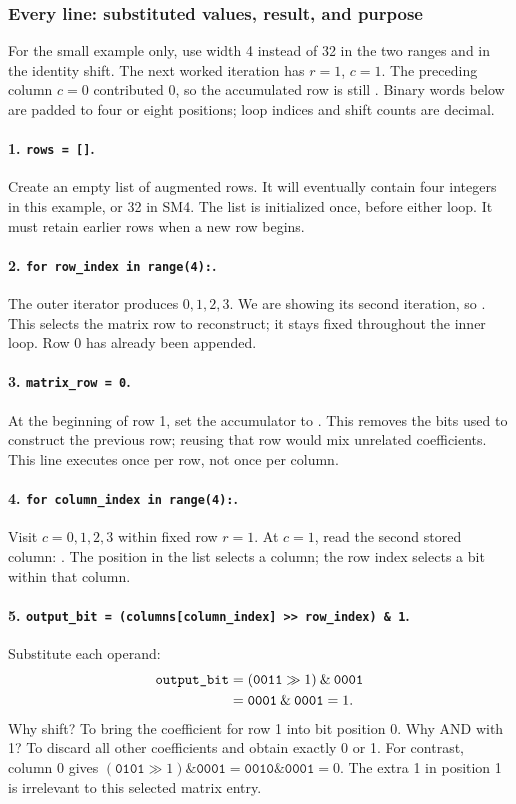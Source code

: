 \subsubsection*{Every line: substituted values, result, and purpose}
For the small example only, use width 4 instead of 32 in the two ranges and in
the identity shift. The next worked iteration has $r=1$, $c=1$.
The preceding column $c=0$ contributed 0, so the accumulated row is still
. Binary words below are padded to four or eight positions; loop
indices and shift counts are decimal.

\paragraph{1. \texttt{rows = []}.}
Create an empty list of augmented rows. It will eventually contain four
integers in this example, or 32 in SM4. The list is initialized once, before
either loop. It must retain earlier rows when a new row begins.

\paragraph{2. \texttt{for row\_index in range(4):}.}
The outer iterator produces $0,1,2,3$. We are showing its second iteration,
so . This selects the matrix row to reconstruct; it stays
fixed throughout the inner loop. Row 0 has already been appended.

\paragraph{3. \texttt{matrix\_row = 0}.}
At the beginning of row 1, set the accumulator to . This removes the
bits used to construct the previous row; reusing that row would mix unrelated
coefficients. This line executes once per row, not once per column.

\paragraph{4. \texttt{for column\_index in range(4):}.}
Visit $c=0,1,2,3$ within fixed row $r=1$. At $c=1$, read the second stored
column: . The position in the list selects a column;
the row index selects a bit within that column.

\paragraph{5. \texttt{output\_bit = (columns[column\_index] >> row\_index) \& 1}.}
Substitute each operand:
\[
\begin{aligned}
\texttt{output\_bit}&=(\texttt{0011}\gg1)\mathbin{\&}\texttt{0001}\\
&=\texttt{0001}\mathbin{\&}\texttt{0001}=1.
\end{aligned}
\]
Why shift? To bring the coefficient for row 1 into bit position 0.
Why AND with 1? To discard all other coefficients and obtain exactly 0 or 1.
For contrast, column 0 gives
$(\texttt{0101}\gg1)\mathbin{\&}\texttt{0001}
=\texttt{0010}\mathbin{\&}\texttt{0001}=0$.
The extra 1 in position 1 is irrelevant to this selected matrix entry.

